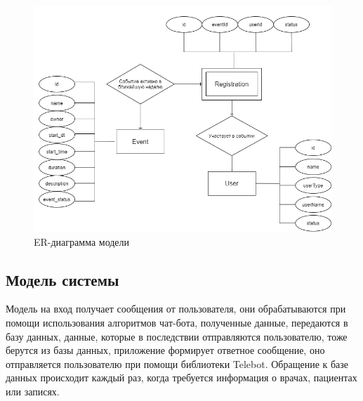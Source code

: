 \documentclass[12pt,a4paper,oneside]{report}
\begin{document}
\begin{figure}[h]
	\centering
	\includegraphics[scale=0.9]{ERdiagram.png}
	\caption{ER-диаграмма модели}
	\label{ris:erdiagram}
\end{figure}

\subsection{Модель системы}
Модель на вход получает сообщения от пользователя, они обрабатываются при помощи использования алгоритмов чат-бота, полученные данные, передаются в базу данных, данные, которые в последствии отправляются пользователю, тоже берутся из базы данных, приложение формирует ответное сообщение, оно отправляется пользователю при помощи библиотеки Telebot.
Обращение к базе данных происходит каждый раз, когда требуется информация о врачах, пациентах или записях.
\end{document}
